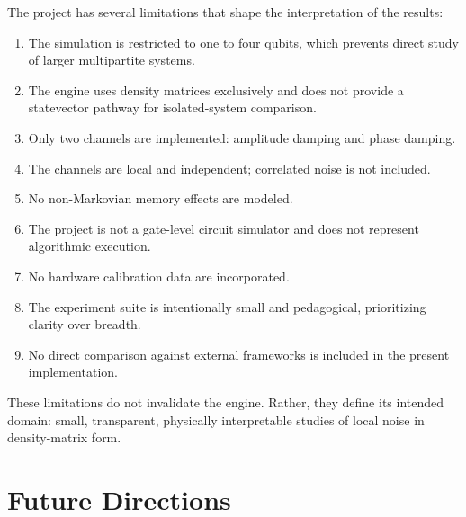 The project has several limitations that shape the interpretation of the results:
\begin{enumerate}
\item The simulation is restricted to one to four qubits, which prevents direct study of larger multipartite systems.
\item The engine uses density matrices exclusively and does not provide a statevector pathway for isolated-system comparison.
\item Only two channels are implemented: amplitude damping and phase damping.
\item The channels are local and independent; correlated noise is not included.
\item No non-Markovian memory effects are modeled.
\item The project is not a gate-level circuit simulator and does not represent algorithmic execution.
\item No hardware calibration data are incorporated.
\item The experiment suite is intentionally small and pedagogical, prioritizing clarity over breadth.
\item No direct comparison against external frameworks is included in the present implementation.
\end{enumerate}

These limitations do not invalidate the engine. Rather, they define its intended domain: small, transparent, physically interpretable studies of local noise in density-matrix form.

\section{Future Directions}

